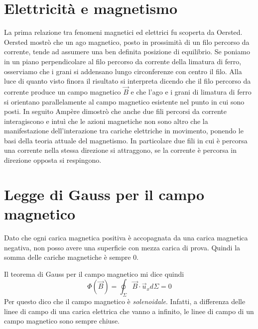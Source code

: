 \documentclass[class=book, crop=false, oneside, 12pt]{standalone}
\begin{document}
\section{Elettricità e magnetismo}

La prima relazione tra fenomeni magnetici ed elettrici fu scoperta da Oersted.
Oersted mostrò che un ago magnetico, posto in prossimità di un filo percorso da corrente, tende ad assumere una ben definita posizione di equilibrio. 
Se poniamo in un piano perpendicolare al filo percorso da corrente della limatura di ferro, osserviamo che i grani si addensano lungo circonferenze con centro il filo. 
Alla luce di quanto visto finora il risultato si interpreta dicendo che il filo percorso da corrente produce un campo magnetico \(\overrightarrow{B}\) e che l'ago e i grani di limatura di ferro si orientano parallelamente al campo magnetico esistente nel punto in cui sono posti. 
In seguito Ampère dimostrò che anche due fili percorsi da corrente interagiscono e intuì che le azioni magnetiche non sono altro che la manifestazione dell'interazione tra cariche elettriche in movimento, ponendo le basi della teoria attuale del magnetismo. 
In particolare due fili in cui è percorsa una corrente nella stessa direzione si attraggono, se la corrente è percorsa in direzione opposta si respingono.

\section{Legge di Gauss per il campo magnetico}

Dato che ogni carica magnetica positiva è accopagnata da una carica magnetica negativa, non posso avere una superficie con mezza carica di prova.
Quindi la somma delle cariche magnetiche è sempre \(0\).

Il teorema di Gauss per il campo magnetico mi dice quindi 
\begin{equation}
    \Phi \left(\overrightarrow{B}\right) = \oint_{\Sigma} \overrightarrow{B} \cdot \overrightarrow{u}_x d \Sigma = 0
\end{equation}
Per questo dico che il campo magnetico è \emph{solenoidale}.
Infatti, a differenza delle linee di campo di una carica elettrica che vanno a infinito, le linee di campo di un campo magnetico sono sempre chiuse.
\end{document}
